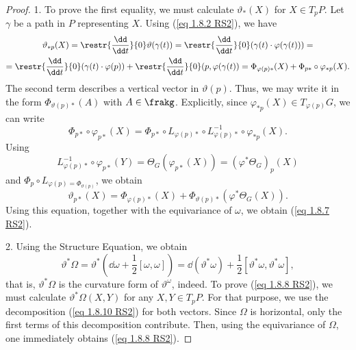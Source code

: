 \begin{proof}
    1. To prove the first equality, we must calculate $\vartheta_\ast(X)$ for $X\in T_pP$. Let $\gamma$ be a path in $P$ representing $X$.  Using (\ref{eq 1.8.2 RS2}), we have
    \begin{multline}
        \vartheta_{\ast p}(X)=\restr{\frac{\dd}{\dd t}}{0}\vartheta(\gamma(t))=\restr{\frac{\dd}{\dd t}}{0} (\gamma(t)\cdot \varphi(\gamma(t)))=
        \\=\restr{\frac{\dd}{\dd t}}{0}(\gamma(t)\cdot \varphi(p))+\restr{\frac{\dd}{\dd t}}{0}(p,\varphi(\gamma(t))=\Phi_{\varphi(p)\ast}(X)+\Phi_{p\ast}\circ \varphi_{\ast p}(X).
    \end{multline}
    The second term describes a vertical vector in $\vartheta(p)$. Thus, we may write it in the form $\Phi_{\vartheta(p)\ast}(A)$ with $A\in\frakg$. Explicitly, since $\varphi_{\ast p}(X)\in T_{\varphi(p)}G$, we can write
    \[\Phi_{p\ast}\circ \varphi_{p\ast }(X)=\Phi_{p\ast}\circ L_{\varphi(p)\ast}\circ L_{\varphi(p)\ast}^{-1}\circ \varphi_{\ast p}(X).\]
    Using
    \[L_{\varphi(p)\ast}^{-1}\circ \varphi_{p\ast}(Y)=\Theta_G(\varphi_{p\ast}(X))=(\varphi^\ast\Theta_G)_p(X)\]
    and $\Phi_p\circ L_{\varphi(p)=\Phi_{\vartheta(p)}}$, we obtain
    \[\vartheta_{p\ast}(X)=\Phi_{\varphi(p)\ast}(X)+\Phi_{\vartheta(p)\ast}(\varphi^\ast\Theta_G(X)).\label{eq 1.8.10 RS2}\]
    Using this equation, together with the equivariance of $\omega$, we obtain (\ref{eq 1.8.7 RS2}).

    2. Using the Structure Equation, we obtain
    \[\vartheta^\ast\Omega=\vartheta^\ast(\dd \omega+\frac12[\omega,\omega])=\dd(\vartheta^\ast\omega)+\frac12[\vartheta^\ast\omega,\vartheta^\ast\omega],\]
    that is, $\vartheta^\ast\Omega$ is the curvature form of $\vartheta^\omega$, indeed. To prove (\ref{eq 1.8.8 RS2}), we must calculate $\vartheta^\ast \Omega(X,Y)$ for any $X,Y\in T_pP$. For that purpose, we use the decomposition (\ref{eq 1.8.10 RS2}) for both vectors. Since $\Omega$ is horizontal, only the first terms of this decomposition contribute. Then, using the equivariance of $\Omega$, one immediately obtains (\ref{eq 1.8.8 RS2}).
\end{proof}

